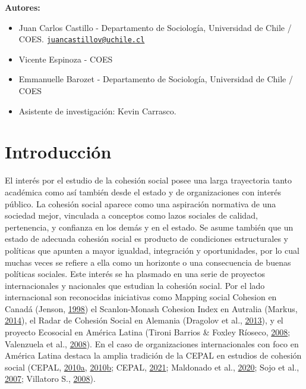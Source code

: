 \documentclass[
  12pt,
]{book}
\begin{document}
\textbf{Autores:}

\begin{itemize}
\item
  Juan Carlos Castillo - Departamento de Sociología, Universidad de Chile / COES. \href{mailto:juancastillov@uchile.cl}{\nolinkurl{juancastillov@uchile.cl}}
\item
  Vicente Espinoza - COES
\item
  Emmanuelle Barozet - Departamento de Sociología, Universidad de Chile / COES
\item
  Asistente de investigación: Kevin Carrasco.
\end{itemize}

\hypertarget{introducciuxf3n}{%
\chapter*{Introducción}\label{introducciuxf3n}}

El interés por el estudio de la cohesión social posee una larga trayectoria tanto académica como así también desde el estado y de organizaciones con interés público. La cohesión social aparece como una aspiración normativa de una sociedad mejor, vinculada a conceptos como lazos sociales de calidad, pertenencia, y confianza en los demás y en el estado. Se asume también que un estado de adecuada cohesión social es producto de condiciones estructurales y políticas que apunten a mayor igualdad, integración y oportunidades, por lo cual muchas veces se refiere a ella como un horizonte o una consecuencia de buenas políticas sociales. Este interés se ha plasmado en una serie de proyectos internacionales y nacionales que estudian la cohesión social. Por el lado internacional son reconocidas iniciativas como Mapping social Cohesion en Canadá (Jenson, \protect\hyperlink{ref-jenson_mapping_1998}{1998}) el Scanlon-Monash Cohesion Index en Autralia (Markus, \protect\hyperlink{ref-markus_mapping_2014}{2014}), el Radar de Cohesión Social en Alemania (Dragolov et al., \protect\hyperlink{ref-dragolov_social_2013}{2013}), y el proyecto Ecosocial en América Latina (Tironi Barrios \& Foxley Ríoseco, \protect\hyperlink{ref-tironibarrios_redes_2008}{2008}; Valenzuela et al., \protect\hyperlink{ref-valenzuela_vinculos_2008}{2008}). En el caso de organizaciones internacionales con foco en América Latina destaca la amplia tradición de la CEPAL en estudios de cohesión social (CEPAL, \protect\hyperlink{ref-cepal_america_2010}{2010}\protect\hyperlink{ref-cepal_america_2010}{a}, \protect\hyperlink{ref-cepal_cohesion_2010}{2010}\protect\hyperlink{ref-cepal_cohesion_2010}{b}; CEPAL, \protect\hyperlink{ref-cepal_cohesion_2021}{2021}; Maldonado et al., \protect\hyperlink{ref-maldonado_inclusion_2020}{2020}; Sojo et al., \protect\hyperlink{ref-sojo_cohesion_2007}{2007}; Villatoro S., \protect\hyperlink{ref-villatoros._sistema_2008}{2008}).
\end{document}
